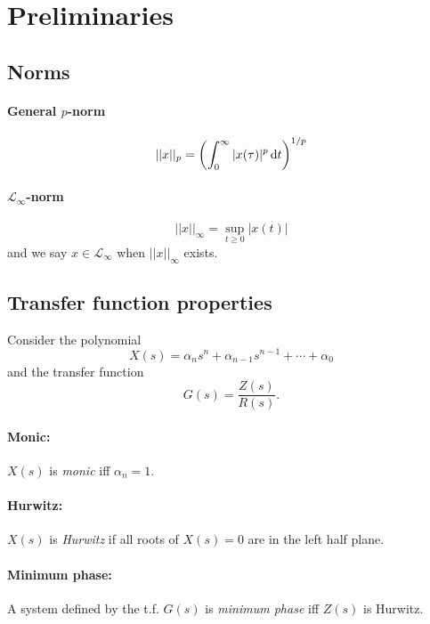 \section{Preliminaries}
\subsection{Norms}
\paragraph{General $p$-norm}
\begin{equation}
	||x||_p
	=
	\left(
		\int_{0}^{\infty} |x(\tau)|^p \dif t
	\right)
	^{1/p}
\end{equation}

\paragraph{$\mathcal{L}_\infty$-norm}
\begin{equation}
	||x||_\infty
	=
	\sup_{t \geq 0} |x(t)|
\end{equation}
and we say $x \in \mathcal{L}_\infty$ when $||x||_\infty$ exists.

\subsection{Transfer function properties}
Consider the polynomial
\begin{equation}
	X(s) = \alpha_n s^n + \alpha_{n-1} s^{n-1} + \cdots + \alpha_0
\end{equation}
and the transfer function
\begin{equation}
	G(s) = \frac{Z(s)}{R(s)}
	.
\end{equation}

\paragraph{Monic:} $X(s)$ is \emph{monic} iff $\alpha_n = 1$.

\paragraph{Hurwitz:} $X(s)$ is \emph{Hurwitz} if all roots of $X(s) = 0$ are in the left half plane.

\paragraph{Minimum phase:} A system defined by the t.f. $G(s)$ is \emph{minimum phase} iff $Z(s)$ is Hurwitz.

